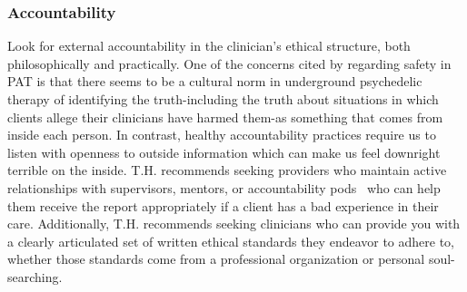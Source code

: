 \documentclass[11pt,oneside]{book}
\let\cite\parencite
\begin{document}
\subsubsection*{Accountability}
Look for external accountability in the clinician's ethical structure, both philosophically and practically. One of the concerns cited by \textcite{powerTrip} regarding safety in PAT is that there seems to be a cultural norm in underground psychedelic therapy of identifying the truth-including the truth about situations in which clients allege their clinicians have harmed them-as something that comes from inside each person. In contrast, healthy accountability practices require us to listen with openness to outside information which can make us feel downright terrible on the inside. T.H. recommends seeking providers who maintain active relationships with supervisors, mentors, or accountability pods~\cite{podmapping} who can help them receive the report appropriately if a client has a bad experience in their care. Additionally, T.H. recommends seeking clinicians who can provide you with a clearly articulated set of written ethical standards they endeavor to adhere to, whether those standards come from a professional organization or personal soul-searching.
\end{document}
